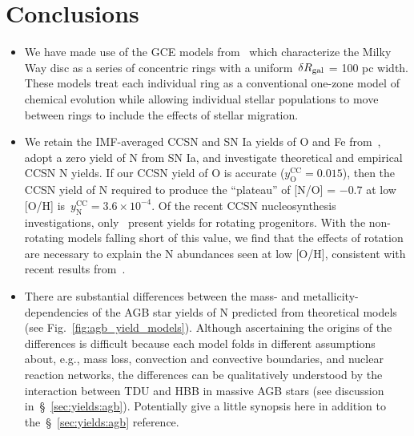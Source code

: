 \documentclass[ms.tex]{subfiles}
\begin{document}
 

\section{Conclusions} 
\label{sec:conclusions} 

\begin{itemize} 
	\item We have made use of the GCE models from~\citet{Johnson2021} which 
	characterize the Milky Way disc as a series of concentric rings with a 
	uniform~$\delta R_\text{gal}$ = 100 pc width. 
	These models treat each individual ring as a conventional one-zone model 
	of chemical evolution while allowing individual stellar populations to move 
	between rings to include the effects of stellar migration. 

	\item We retain the IMF-averaged CCSN and SN Ia yields of O and Fe 
	from~\citet{Johnson2021}, adopt a zero yield of N from SN Ia, and 
	investigate theoretical and empirical CCSN N yields. 
	If our CCSN yield of O is accurate ($y_\text{O}^\text{CC} = 0.015$), then 
	the CCSN yield of N required to produce the ``plateau'' of [N/O] = $-0.7$ 
	at low [O/H] is~$y_\text{N}^\text{CC} = 3.6\times10^{-4}$. 
	Of the recent CCSN nucleosynthesis investigations, only~\citet{Limongi2018} 
	present yields for rotating progenitors. 
	With the non-rotating models falling short of this value, we find that the 
	effects of rotation are necessary to explain the N abundances seen at low 
	[O/H], consistent with recent results from~\citet{Grisoni2021}. 

	\item There are substantial differences between the mass- and 
	metallicity-dependencies of the AGB star yields of N predicted from 
	theoretical models (see Fig.~\ref{fig:agb_yield_models}). 
	Although ascertaining the origins of the differences is difficult because 
	each model folds in different assumptions about, e.g., mass loss, 
	convection and convective boundaries, and nuclear reaction networks, the 
	differences can be qualitatively understood by the interaction between 
	TDU and HBB in massive AGB stars (see discussion 
	in~\S~\ref{sec:yields:agb}). 
	{\color{red} 
	Potentially give a little synopsis here in addition to 
	the~\S~\ref{sec:yields:agb} reference. 
	} 


\end{itemize}
\end{document}
